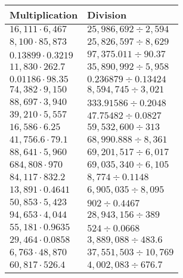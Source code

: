 \begin{longtable}[]{@{}ll@{}}
\toprule
Multiplication & Division\tabularnewline
\midrule
\endhead
\(16,111\cdot6,467\) & \(25,986,692÷2,594\)\tabularnewline
\(8,100\cdot85,873\) & \(25,826,597÷8,629\)\tabularnewline
\(0.13899\cdot 0.3219\) & \(97,375.011÷90.37\)\tabularnewline
\(11,830\cdot262.7\) & \(35,890,992÷5,958\)\tabularnewline
\(0.01186\cdot98.35\) & \(0.236879÷0.13424\)\tabularnewline
\(74,382\cdot9,150\) & \(8,594,745÷3,021\)\tabularnewline
\(88,697\cdot3,940\) & \(333.91586÷0.2048\)\tabularnewline
\(39,210\cdot 5,557\) & \(47.75482÷0.0827\)\tabularnewline
\(16,586\cdot6.25\) & \(59,532,600÷313\)\tabularnewline
\(41,756.6\cdot79.1\) & \(68,990.888÷8,361\)\tabularnewline
\(88,641\cdot5,960\) & \(69,201,517÷6,017\)\tabularnewline
\(684,808\cdot970\) & \(69,035,340÷6,105\)\tabularnewline
\(84,117\cdot832.2\) & \(8,774÷0.1148\)\tabularnewline
\(13,891\cdot0.4641\) & \(6,905,035÷8,095\)\tabularnewline
\(50,853\cdot5,423\) & \(902÷0.4467\)\tabularnewline
\(94,653\cdot4,044\) & \(28,943,156÷389\)\tabularnewline
\(55,181\cdot0.9635\) & \(524÷0.0668\)\tabularnewline
\(29,464\cdot0.0858\) & \(3,889,088 ÷483.6\)\tabularnewline
\(6,763\cdot48,870\) & \(37,551,503÷10,769\)\tabularnewline
\(60,817\cdot526.4\) & \(4,002,083÷676.7\)\tabularnewline
\bottomrule
\end{longtable}
